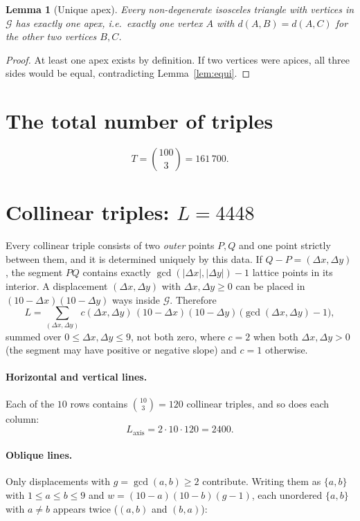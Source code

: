 \documentclass[11pt,a4paper]{article}
\newtheorem{lemma}{Lemma}
\theoremstyle{remark}
\newcommand{\G}{\mathcal{G}}
\begin{document}
\begin{lemma}[Unique apex]\label{lem:apex}
Every non-degenerate isosceles triangle with vertices in $\G$ has exactly one
\emph{apex}, i.e.\ exactly one vertex $A$ with $d(A,B)=d(A,C)$ for the other two
vertices $B,C$.
\end{lemma}
\begin{proof}
At least one apex exists by definition. If two vertices were apices, all three
sides would be equal, contradicting Lemma~\ref{lem:equi}.
\end{proof}

\section{The total number of triples}
\[
  T=\binom{100}{3}=161\,700 .
\]

\section{Collinear triples: $L=4448$}

Every collinear triple consists of two \emph{outer} points $P,Q$ and one point
strictly between them, and it is determined uniquely by this data. If
$Q-P=(\Delta x,\Delta y)$, the segment $PQ$ contains exactly
$\gcd(|\Delta x|,|\Delta y|)-1$ lattice points in its interior. A displacement
$(\Delta x,\Delta y)$ with $\Delta x,\Delta y\ge 0$ can be placed in
$(10-\Delta x)(10-\Delta y)$ ways inside $\G$. Therefore
\[
  L=\sum_{(\Delta x,\Delta y)} c(\Delta x,\Delta y)\,(10-\Delta x)(10-\Delta y)\,
     \bigl(\gcd(\Delta x,\Delta y)-1\bigr),
\]
summed over $0\le\Delta x,\Delta y\le 9$, not both zero, where $c=2$ when both
$\Delta x,\Delta y>0$ (the segment may have positive or negative slope) and $c=1$
otherwise.

\paragraph{Horizontal and vertical lines.} Each of the $10$ rows contains
$\binom{10}{3}=120$ collinear triples, and so does each column:
\[
  L_{\text{axis}} = 2\cdot 10\cdot 120 = 2400 .
\]

\paragraph{Oblique lines.} Only displacements with $g=\gcd(a,b)\ge2$ contribute.
Writing them as $\{a,b\}$ with $1\le a\le b\le 9$ and
$w=(10-a)(10-b)(g-1)$, each unordered $\{a,b\}$ with $a\neq b$ appears twice
($(a,b)$ and $(b,a)$):
\end{document}

